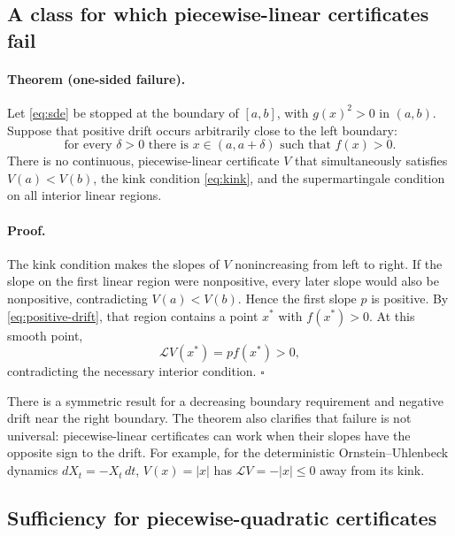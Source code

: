 \documentclass[10pt]{extarticle}
\begin{document}
\subsection{A class for which piecewise-linear certificates fail}

\paragraph{Theorem (one-sided failure).}
Let \eqref{eq:sde} be stopped at the boundary of $[a,b]$, with
$g(x)^2>0$ in $(a,b)$.  Suppose that positive drift occurs arbitrarily close
to the left boundary:
\begin{equation}
  \text{for every }\delta>0\text{ there is }x\in(a,a+\delta)
  \text{ such that }f(x)>0.
  \label{eq:positive-drift}
\end{equation}
There is no continuous, piecewise-linear certificate $V$ that simultaneously
satisfies $V(a)<V(b)$, the kink condition \eqref{eq:kink}, and the
supermartingale condition on all interior linear regions.

\paragraph{Proof.}
The kink condition makes the slopes of $V$ nonincreasing from left to right.
If the slope on the first linear region were nonpositive, every later slope
would also be nonpositive, contradicting $V(a)<V(b)$.  Hence the first slope
$p$ is positive.  By \eqref{eq:positive-drift}, that region contains a point
$x^\ast$ with $f(x^\ast)>0$.  At this smooth point,
\begin{equation}
  \mathcal LV(x^\ast)=p f(x^\ast)>0,
\end{equation}
contradicting the necessary interior condition. \hfill$\square$

There is a symmetric result for a decreasing boundary requirement and negative
drift near the right boundary.  The theorem also clarifies that failure is not
universal: piecewise-linear certificates can work when their slopes have the
opposite sign to the drift.  For example, for the deterministic
Ornstein--Uhlenbeck dynamics $dX_t=-X_t\,dt$, $V(x)=|x|$ has
$\mathcal LV=-|x|\leq0$ away from its kink.

\subsection{Sufficiency for piecewise-quadratic certificates}
\end{document}
